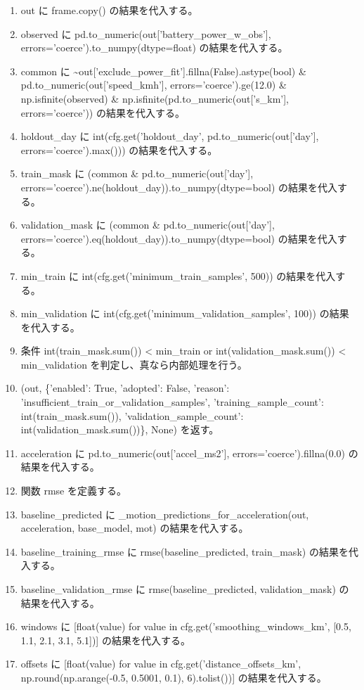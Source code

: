 \documentclass[a4paper,11pt]{article}
\begin{document}
\begin{enumerate}[leftmargin=1.8em]
\item out に frame.copy() の結果を代入する。
\item observed に pd.to\_numeric(out['battery\_power\_w\_obs'], errors='coerce').to\_numpy(dtype=float) の結果を代入する。
\item common に \textasciitilde{}out['exclude\_power\_fit'].fillna(False).astype(bool) \& pd.to\_numeric(out['speed\_kmh'], errors='coerce').ge(12.0) \& np.isfinite(observed) \& np.isfinite(pd.to\_numeric(out['s\_km'], errors='coerce')) の結果を代入する。
\item holdout\_day に int(cfg.get('holdout\_day', pd.to\_numeric(out['day'], errors='coerce').max())) の結果を代入する。
\item train\_mask に (common \& pd.to\_numeric(out['day'], errors='coerce').ne(holdout\_day)).to\_numpy(dtype=bool) の結果を代入する。
\item validation\_mask に (common \& pd.to\_numeric(out['day'], errors='coerce').eq(holdout\_day)).to\_numpy(dtype=bool) の結果を代入する。
\item min\_train に int(cfg.get('minimum\_train\_samples', 500)) の結果を代入する。
\item min\_validation に int(cfg.get('minimum\_validation\_samples', 100)) の結果を代入する。
\item 条件 int(train\_mask.sum()) < min\_train or int(validation\_mask.sum()) < min\_validation を判定し、真なら内部処理を行う。
\item   (out, \{'enabled': True, 'adopted': False, 'reason': 'insufficient\_train\_or\_validation\_samples', 'training\_sample\_count': int(train\_mask.sum()), 'validation\_sample\_count': int(validation\_mask.sum())\}, None) を返す。
\item acceleration に pd.to\_numeric(out['accel\_ms2'], errors='coerce').fillna(0.0) の結果を代入する。
\item 関数 rmse を定義する。
\item baseline\_predicted に \_motion\_predictions\_for\_acceleration(out, acceleration, base\_model, mot) の結果を代入する。
\item baseline\_training\_rmse に rmse(baseline\_predicted, train\_mask) の結果を代入する。
\item baseline\_validation\_rmse に rmse(baseline\_predicted, validation\_mask) の結果を代入する。
\item windows に [float(value) for value in cfg.get('smoothing\_windows\_km', [0.5, 1.1, 2.1, 3.1, 5.1])] の結果を代入する。
\item offsets に [float(value) for value in cfg.get('distance\_offsets\_km', np.round(np.arange(-0.5, 0.5001, 0.1), 6).tolist())] の結果を代入する。

\end{enumerate}
\end{document}
